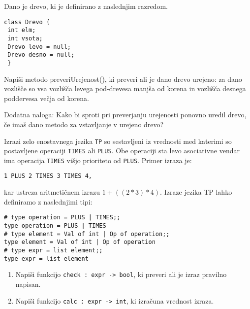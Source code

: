 \begin{ex}
Dano je drevo, ki je definirano z naslednjim razredom.

\begin{lstlisting}
class Drevo {
 int elm;
 int vsota;
 Drevo levo = null;
 Drevo desno = null;
 }
\end{lstlisting}

Napi\v si metodo preveriUrejenost(), ki preveri ali je dano drevo urejeno: za dano vozli\v s\v ce so vsa vozli\v s\v ca levega pod-drevesa manj\v sa od korena in vozli\v s\v ca desnega poddervesa ve\v cja od korena. 

Dodatna naloga: Kako bi sproti pri preverjanju urejenosti ponovno uredil drevo, \v ce ima\v s dano metodo za vstavljanje v urejeno drevo?
\end{ex}
\begin{ex}
   Izrazi zelo enostavnega jezika \lstinline{TP} so sestavljeni iz
   vrednosti med katerimi so postavljene operaciji \lstinline{TIMES} ali
   \lstinline{PLUS}. Obe operaciji sta levo asociativne vendar ima
   operacija \lstinline{TIMES} vi\v sjo prioriteto od
   \lstinline{PLUS}. Primer izraza je:

\begin{lstlisting}
1 PLUS 2 TIMES 3 TIMES 4,
\end{lstlisting}

   kar ustreza aritmeti\v cnem izrazu $1 + ((2 * 3) * 4)$. Izraze jezika
   TP lahko definiramo z naslednjimi tipi:
 
   \begin{lstlisting}
# type operation = PLUS | TIMES;; 
type operation = PLUS | TIMES 
# type element = Val of int | Op of operation;; 
type element = Val of int | Op of operation
# type expr = list element;;
type expr = list element
\end{lstlisting}

   \begin{enumerate}[label=(\roman*)]
   \item Napi\v si funkcijo \lstinline{check : expr -> bool}, ki preveri
     ali je izraz pravilno napisan.

   \item Napi\v si funkcijo \lstinline{calc : expr -> int}, ki izra\v
     cuna vrednost izraza.
   \end{enumerate}


\end{ex}
